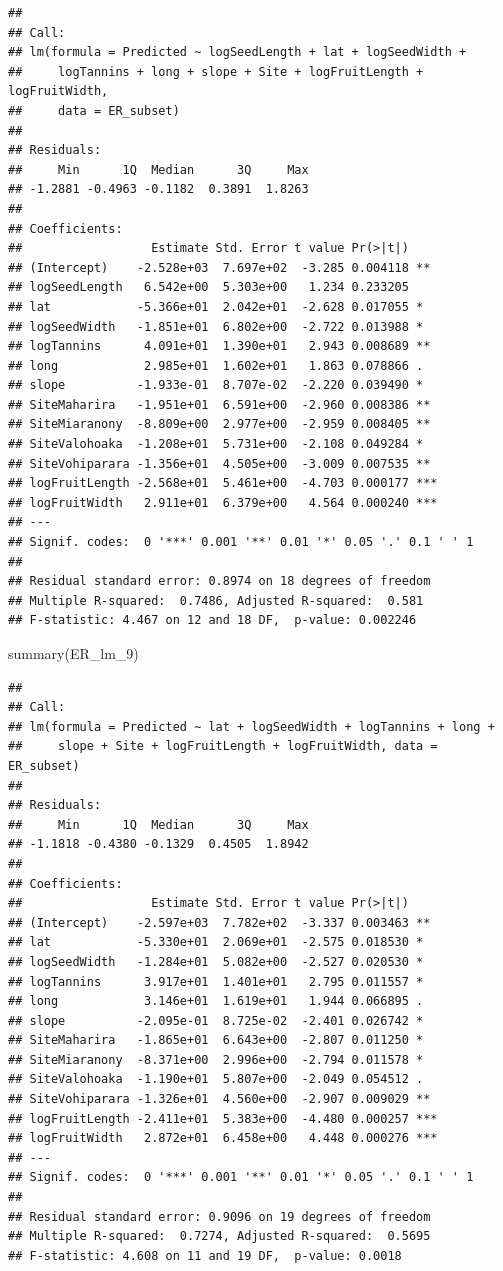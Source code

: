 \documentclass[
  12pt,
]{article}
\newenvironment{Shaded}{\begin{snugshade}}{\end{snugshade}}
\newcommand{\FunctionTok}[1]{\textcolor[rgb]{0.00,0.00,0.00}{#1}}
\newcommand{\NormalTok}[1]{#1}
\begin{document}
\begin{verbatim}
## 
## Call:
## lm(formula = Predicted ~ logSeedLength + lat + logSeedWidth + 
##     logTannins + long + slope + Site + logFruitLength + logFruitWidth, 
##     data = ER_subset)
## 
## Residuals:
##     Min      1Q  Median      3Q     Max 
## -1.2881 -0.4963 -0.1182  0.3891  1.8263 
## 
## Coefficients:
##                  Estimate Std. Error t value Pr(>|t|)    
## (Intercept)    -2.528e+03  7.697e+02  -3.285 0.004118 ** 
## logSeedLength   6.542e+00  5.303e+00   1.234 0.233205    
## lat            -5.366e+01  2.042e+01  -2.628 0.017055 *  
## logSeedWidth   -1.851e+01  6.802e+00  -2.722 0.013988 *  
## logTannins      4.091e+01  1.390e+01   2.943 0.008689 ** 
## long            2.985e+01  1.602e+01   1.863 0.078866 .  
## slope          -1.933e-01  8.707e-02  -2.220 0.039490 *  
## SiteMaharira   -1.951e+01  6.591e+00  -2.960 0.008386 ** 
## SiteMiaranony  -8.809e+00  2.977e+00  -2.959 0.008405 ** 
## SiteValohoaka  -1.208e+01  5.731e+00  -2.108 0.049284 *  
## SiteVohiparara -1.356e+01  4.505e+00  -3.009 0.007535 ** 
## logFruitLength -2.568e+01  5.461e+00  -4.703 0.000177 ***
## logFruitWidth   2.911e+01  6.379e+00   4.564 0.000240 ***
## ---
## Signif. codes:  0 '***' 0.001 '**' 0.01 '*' 0.05 '.' 0.1 ' ' 1
## 
## Residual standard error: 0.8974 on 18 degrees of freedom
## Multiple R-squared:  0.7486, Adjusted R-squared:  0.581 
## F-statistic: 4.467 on 12 and 18 DF,  p-value: 0.002246
\end{verbatim}

\begin{Shaded}
\begin{Highlighting}[]
\FunctionTok{summary}\NormalTok{(ER\_lm\_9)}
\end{Highlighting}
\end{Shaded}

\begin{verbatim}
## 
## Call:
## lm(formula = Predicted ~ lat + logSeedWidth + logTannins + long + 
##     slope + Site + logFruitLength + logFruitWidth, data = ER_subset)
## 
## Residuals:
##     Min      1Q  Median      3Q     Max 
## -1.1818 -0.4380 -0.1329  0.4505  1.8942 
## 
## Coefficients:
##                  Estimate Std. Error t value Pr(>|t|)    
## (Intercept)    -2.597e+03  7.782e+02  -3.337 0.003463 ** 
## lat            -5.330e+01  2.069e+01  -2.575 0.018530 *  
## logSeedWidth   -1.284e+01  5.082e+00  -2.527 0.020530 *  
## logTannins      3.917e+01  1.401e+01   2.795 0.011557 *  
## long            3.146e+01  1.619e+01   1.944 0.066895 .  
## slope          -2.095e-01  8.725e-02  -2.401 0.026742 *  
## SiteMaharira   -1.865e+01  6.643e+00  -2.807 0.011250 *  
## SiteMiaranony  -8.371e+00  2.996e+00  -2.794 0.011578 *  
## SiteValohoaka  -1.190e+01  5.807e+00  -2.049 0.054512 .  
## SiteVohiparara -1.326e+01  4.560e+00  -2.907 0.009029 ** 
## logFruitLength -2.411e+01  5.383e+00  -4.480 0.000257 ***
## logFruitWidth   2.872e+01  6.458e+00   4.448 0.000276 ***
## ---
## Signif. codes:  0 '***' 0.001 '**' 0.01 '*' 0.05 '.' 0.1 ' ' 1
## 
## Residual standard error: 0.9096 on 19 degrees of freedom
## Multiple R-squared:  0.7274, Adjusted R-squared:  0.5695 
## F-statistic: 4.608 on 11 and 19 DF,  p-value: 0.0018
\end{verbatim}
\end{document}
